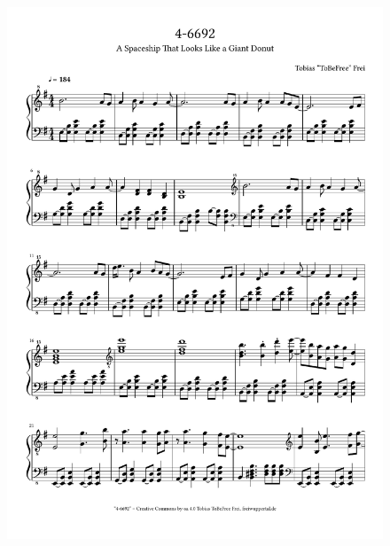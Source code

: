\begin{figure}[p]
    \includegraphics[width=\textwidth, page=2]{z-include-ia2theme.pdf}
\end{figure}

